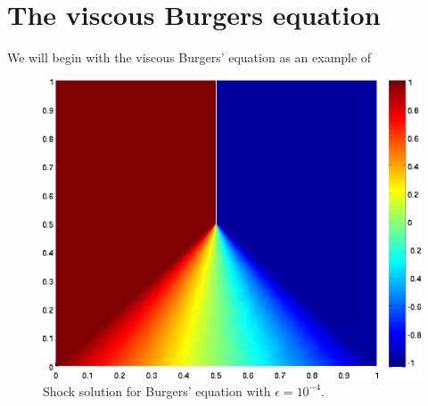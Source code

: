 \section{The viscous Burgers equation}

We will begin with the viscous Burgers' equation as an example of 

\begin{figure}[!h]
\centering
\includegraphics[scale=.5]{figs/burgers1e4.png}
\caption{Shock solution for Burgers' equation with $\epsilon = 10^{-4}$.} 
\end{figure}
